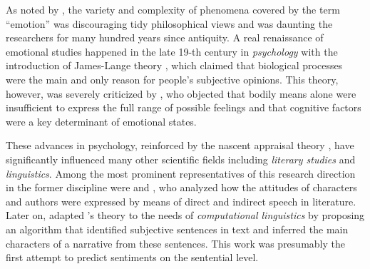 As noted by \citet{Sousa:14}, the variety and complexity of phenomena
covered by the term ``emotion'' was discouraging tidy philosophical
views and was daunting the researchers for many hundred years since
antiquity.  A real renaissance of emotional studies happened in the
late 19-th century in \emph{psychology} with the introduction of
James-Lange theory \cite{James:1884,Lange:1885}, which claimed that
biological processes were the main and only reason for people's
subjective opinions.  This theory, however, was severely criticized by
\citet{Schachter:62}, who objected that bodily means alone were
insufficient to express the full range of possible feelings and that
cognitive factors were a key determinant of emotional states.


These advances in psychology, reinforced by the nascent appraisal
theory \citep{Arnold:60}, have significantly influenced many other
scientific fields including \emph{literary studies} and
\emph{linguistics}.  Among the most prominent representatives of this
research direction in the former discipline were \citet{Rorty:80} and
\citet{Banfield:82}, who analyzed how the attitudes of characters and
authors were expressed by means of direct and indirect speech in
literature.  Later on, \citet{Wiebe:90a,Wiebe:94} adapted
\citeauthor{Banfield:82}'s theory to the needs of \emph{computational
  linguistics} by proposing an algorithm that identified subjective
sentences in text and inferred the main characters of a narrative from
these sentences.  This work was presumably the first attempt to
predict sentiments on the sentential level.

